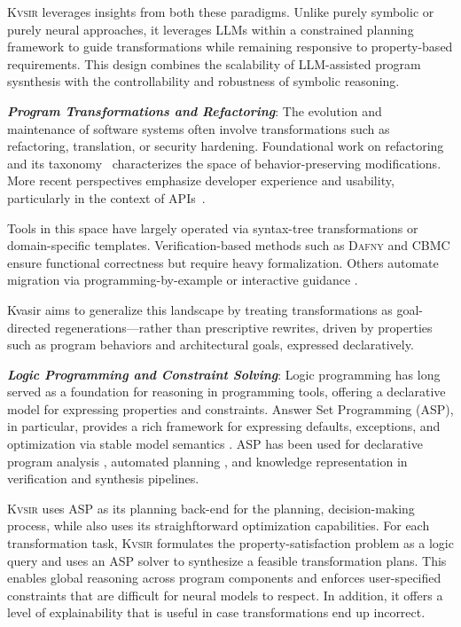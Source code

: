 \documentclass[sigplan]{acmart}
\newcommand{\sys}{{\scshape Kv{\textalpha}sir}\xspace}
\newcommand{\heading}[1]{\vspace{2pt}\noindent\textbf{\emph{#1}}:\enspace}
\begin{document}
\sys leverages insights from both these paradigms.
Unlike purely symbolic or purely neural approaches, it leverages LLMs within a
constrained planning framework to guide transformations while remaining
responsive to property-based requirements.
This design combines
the scalability of LLM-assisted program sysnthesis with the controllability and robustness of symbolic
reasoning. %

\heading{Program Transformations and Refactoring}
The evolution and maintenance of software systems often involve transformations
such as refactoring, translation, or security hardening. Foundational work on
refactoring~\cite{Fowler99} and its taxonomy~\cite{Mens04} characterizes the
space of behavior-preserving modifications. More recent perspectives emphasize
developer experience and usability, particularly in the context of APIs~\cite{Myers16}.

Tools in this space have largely operated via syntax-tree transformations or
domain-specific templates. Verification-based methods such as \textsc{Dafny}
\cite{Leino10} and \textsc{CBMC} \cite{Clarke04} ensure functional correctness
but require heavy formalization.
Others automate migration via
programming-by-example or interactive guidance \cite{gulwani2017program, le2017interactive}.

Kvasir aims to generalize this landscape by treating transformations as
goal-directed regenerations---rather than prescriptive rewrites, driven by
properties such as program behaviors and architectural goals, expressed declaratively.

\heading{Logic Programming and Constraint Solving}
Logic programming has long served as a foundation for reasoning in programming
tools, offering a declarative model for expressing properties and constraints.
Answer Set Programming (ASP), in particular, provides a rich framework for
expressing defaults, exceptions, and optimization via stable model semantics
\cite{Gelfond_2000, Gelfond_2002, Eiter_2009}. ASP has been used for
declarative program analysis \cite{benton2007interactive}, automated planning
\cite{nguyen2020explainable, son2022answersetplanningsurvey}, and knowledge
representation in verification and synthesis pipelines.

\sys uses ASP as its planning back-end for the planning, decision-making
process, while also uses its straighftorward optimization capabilities.
For each transformation task, \sys formulates the property-satisfaction problem as a logic query and uses an ASP solver to
synthesize a feasible transformation plans.
This enables global reasoning across program components and enforces
user-specified constraints that are difficult for neural models to respect.
In addition, it offers a level of explainability that is useful in case transformations end up incorrect.
\end{document}
